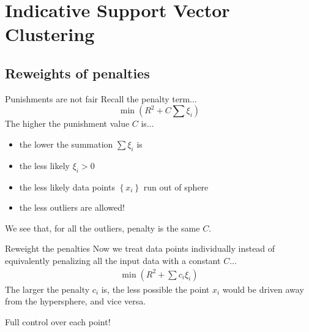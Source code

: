 \section{Indicative Support Vector Clustering}
\subsection{Reweights of penalties}
\begin{frame}{Punishments are not fair}
Recall the penalty term...
\[
\min \left(R^2 + C\sum \xi_i\right)
\]
The higher the punishment value $C$ is...
\begin{itemize}
\item the lower the summation $\sum \xi_i$ is
\item the less likely $\xi_i > 0$
\item the less likely data points $\left\lbrace x_i\right\rbrace$ run out of sphere
\item the less outliers are allowed!
\end{itemize}
\pause
\vskip20pt 
\color{red} We see that, for all the outliers, penalty is the same $C$.
\end{frame}
\begin{frame}{Reweight the penalties}
Now we treat data points individually instead of equivalently penalizing all the input data with a constant $C$...
\begin{align}
\min \left(R^2 + \sum c_i\xi_i\right) \nonumber
\end{align}  
The larger the penalty $c_i$ is, the less possible the point $x_i$ would be driven away from the hypersphere, and vice versa. 
\pause
\vskip30pt
\begin{center}
\large
\color{blue} Full control over each point!
\end{center}
\end{frame}
